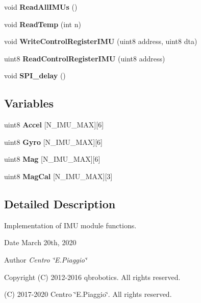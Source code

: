 \begin{DoxyCompactItemize}
\mbox{\label{_i_m_u__functions_8c_a27bf3026dfe4cb0d6d255decc9944d71}} 
void {\bfseries Read\+All\+I\+M\+Us} ()
\item 
\mbox{\label{_i_m_u__functions_8c_ab0883cd12ebf2937fd6da478ac3ab976}} 
void {\bfseries Read\+Temp} (int n)
\item 
\mbox{\label{_i_m_u__functions_8c_aa907fcabe23515e5a6fb4187dd652ec3}} 
void {\bfseries Write\+Control\+Register\+I\+MU} (uint8 address, uint8 dta)
\item 
\mbox{\label{_i_m_u__functions_8c_ac1f1dc30233302bf8c1955c56ae837ae}} 
uint8 {\bfseries Read\+Control\+Register\+I\+MU} (uint8 address)
\item 
\mbox{\label{_i_m_u__functions_8c_a26f85d9c393e73879461861d2ac87379}} 
void {\bfseries S\+P\+I\+\_\+delay} ()
\end{DoxyCompactItemize}
\subsection*{Variables}
\begin{DoxyCompactItemize}
\item 
\mbox{\label{_i_m_u__functions_8c_a187c605f3898cf11e09f6f469c265920}} 
uint8 {\bfseries Accel} [N\+\_\+\+I\+M\+U\+\_\+\+M\+AX][6]
\item 
\mbox{\label{_i_m_u__functions_8c_a49dba88a31d1b3b4190065b9ef1649fe}} 
uint8 {\bfseries Gyro} [N\+\_\+\+I\+M\+U\+\_\+\+M\+AX][6]
\item 
\mbox{\label{_i_m_u__functions_8c_a5d88408ccb73729f049a52b4d1daaadf}} 
uint8 {\bfseries Mag} [N\+\_\+\+I\+M\+U\+\_\+\+M\+AX][6]
\item 
\mbox{\label{_i_m_u__functions_8c_a1e598e1bdae5fe927fbd1f396161f3a6}} 
uint8 {\bfseries Mag\+Cal} [N\+\_\+\+I\+M\+U\+\_\+\+M\+AX][3]
\end{DoxyCompactItemize}


\subsection{Detailed Description}
Implementation of I\+MU module functions. 

\begin{DoxyDate}{Date}
March 20th, 2020 
\end{DoxyDate}
\begin{DoxyAuthor}{Author}
{\itshape Centro \char`\"{}\+E.\+Piaggio\char`\"{}} 
\end{DoxyAuthor}
\begin{DoxyCopyright}{Copyright}
(C) 2012-\/2016 qbrobotics. All rights reserved. 

(C) 2017-\/2020 Centro \char`\"{}\+E.\+Piaggio\char`\"{}. All rights reserved. 
\end{DoxyCopyright}
